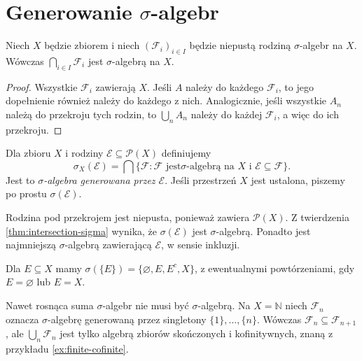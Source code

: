 \section{Generowanie \texorpdfstring{$\sigma$}{sigma}-algebr}

\begin{twierdzenie}
\label{thm:intersection-sigma}
Niech $X$ będzie zbiorem i niech $(\mathcal F_i)_{i\in I}$ będzie
niepustą rodziną $\sigma$-algebr na $X$. Wówczas
$\bigcap_{i\in I}\mathcal F_i$ jest $\sigma$-algebrą na $X$.
\end{twierdzenie}
\begin{proof}
Wszystkie $\mathcal F_i$ zawierają $X$. Jeśli $A$ należy do każdego
$\mathcal F_i$, to jego dopełnienie również należy do każdego z nich.
Analogicznie, jeśli wszystkie $A_n$ należą do przekroju tych rodzin,
to $\bigcup_nA_n$ należy do każdej $\mathcal F_i$, a więc do ich przekroju.
\end{proof}

\begin{definicja}
\label{def:sigma-generated}
Dla zbioru $X$ i rodziny $\mathcal E\subseteq\mathcal P(X)$ definiujemy
\[
\sigma_X(\mathcal E)=\bigcap\{\mathcal F:\mathcal F\text{ jest
$\sigma$-algebrą na }X\text{ i }\mathcal E\subseteq\mathcal F\}.
\]
Jest to \emph{$\sigma$-algebra generowana przez $\mathcal E$}.
Jeśli przestrzeń $X$ jest ustalona, piszemy po prostu $\sigma(\mathcal E)$.
\end{definicja}

Rodzina pod przekrojem jest niepusta, ponieważ zawiera $\mathcal P(X)$.
Z twierdzenia \ref{thm:intersection-sigma} wynika, że $\sigma(\mathcal E)$
jest $\sigma$-algebrą. Ponadto jest najmniejszą $\sigma$-algebrą
zawierającą $\mathcal E$, w sensie inkluzji.

\begin{przyklad}
Dla $E\subseteq X$ mamy
$\sigma(\{E\})=\{\varnothing,E,E^c,X\}$, z ewentualnymi powtórzeniami,
gdy $E=\varnothing$ lub $E=X$.
\end{przyklad}

\begin{uwaga}
Nawet rosnąca suma $\sigma$-algebr nie musi być $\sigma$-algebrą.
Na $X=\mathbb N$ niech $\mathcal F_n$ oznacza $\sigma$-algebrę
generowaną przez singletony $\{1\},\ldots,\{n\}$.
Wówczas $\mathcal F_n\subseteq\mathcal F_{n+1}$, ale
$\bigcup_n\mathcal F_n$ jest tylko algebrą zbiorów skończonych i
kofinitywnych, znaną z przykładu \ref{ex:finite-cofinite}.
\end{uwaga}

